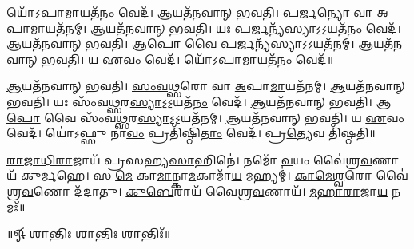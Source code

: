 𑌯𑍋᳴𑌽𑌪𑌾\-\ul{𑌮𑌾}\-𑌯𑌤᳴\-\ul{𑌨𑌂} 𑌵𑍇𑌦᳴। \ul{𑌆}\-𑌯𑌤᳴𑌨𑌵𑌾𑌨𑍍‌ 𑌭𑌵𑌤𑌿।
\-\ul{𑌪}\-𑌰𑍍𑌜\-\ul{𑌨𑍍𑌯𑍋} 𑌵𑌾 \ul{𑌅}\-𑌪𑌾\-\ul{𑌮𑌾}\-𑌯𑌤᳴𑌨𑌮𑍍। \ul{𑌆}\-𑌯𑌤᳴𑌨𑌵𑌾𑌨𑍍‌ 𑌭𑌵𑌤𑌿। 
𑌯𑌃 \ul{𑌪}\-𑌰𑍍𑌜𑌨𑍍𑌯᳴\-\ul{𑌸𑍍𑌯𑌾}\-𑌽॒𑌽॒𑌯𑌤᳴\-\ul{𑌨𑌂} 𑌵𑍇𑌦᳴। \ul{𑌆}\-𑌯𑌤᳴𑌨𑌵𑌾𑌨𑍍‌ 𑌭𑌵𑌤𑌿। 
𑌆\-\ul{𑌪𑍋} 𑌵𑍈 \ul{𑌪}\-𑌰𑍍𑌜𑌨𑍍𑌯᳴\-\ul{𑌸𑍍𑌯𑌾}\-𑌽॒𑌽॒𑌯𑌤᳴𑌨𑌮𑍍। \ul{𑌆}\-𑌯𑌤᳴𑌨𑌵𑌾𑌨𑍍‌ 𑌭𑌵𑌤𑌿। 
𑌯 \ul{𑌏}\-𑌵𑌂 𑌵𑍇𑌦᳴। 𑌯𑍋᳴𑌽𑌪𑌾\-\ul{𑌮𑌾}\-𑌯𑌤᳴\-\ul{𑌨𑌂} 𑌵𑍇𑌦᳴॥



\-\ul{𑌆}\-𑌯𑌤᳴𑌨𑌵𑌾𑌨𑍍‌ 𑌭𑌵𑌤𑌿। \ul{𑌸𑌂}\-\-\ul{𑌵}\-\-\ul{𑌥𑍍𑌸}\-𑌰𑍋 𑌵𑌾 \ul{𑌅}\-𑌪𑌾\-\ul{𑌮𑌾}\-𑌯𑌤᳴𑌨𑌮𑍍। 
\-\ul{𑌆}\-𑌯𑌤᳴𑌨𑌵𑌾𑌨𑍍‌ 𑌭𑌵𑌤𑌿। 𑌯𑌃 𑌸𑌂᳴𑌵\-\ul{𑌥𑍍𑌸}\-𑌰\-\ul{𑌸𑍍𑌯𑌾}\-𑌽॒𑌽॒𑌯𑌤᳴\-\ul{𑌨𑌂} 𑌵𑍇𑌦᳴। 
\-\ul{𑌆}\-𑌯𑌤᳴𑌨𑌵𑌾𑌨𑍍‌ 𑌭𑌵𑌤𑌿। 𑌆\-\ul{𑌪𑍋} 𑌵𑍈 𑌸𑌂᳴𑌵\-\ul{𑌥𑍍𑌸}\-𑌰\-\ul{𑌸𑍍𑌯𑌾}\-𑌽॒𑌽॒𑌯𑌤᳴𑌨𑌮𑍍‌। 
\-\ul{𑌆}\-𑌯𑌤᳴𑌨𑌵𑌾𑌨𑍍‌ 𑌭𑌵𑌤𑌿। 𑌯 \ul{𑌏}\-𑌵𑌂 𑌵𑍇𑌦᳴। 
𑌯𑍋॑𑌽𑌫𑍍𑌸𑍁 𑌨𑌾\-\ul{𑌵𑌂} 𑌪𑍍𑌰𑌤𑌿᳴𑌷𑍍𑌠𑌿\-\ul{𑌤𑌾𑌂} 𑌵𑍇𑌦᳴। 𑌪𑍍𑌰\-\ul{𑌤𑍍𑌯𑍇}\-𑌵 𑌤𑌿᳴𑌷𑍍𑌠𑌤𑌿॥

\-\ul{𑌰𑌾}\-\-\ul{𑌜𑌾}\-\-\ul{𑌧𑌿}\-\-\ul{𑌰𑌾}\-𑌜𑌾𑌯᳴ 𑌪𑍍𑌰𑌸𑌹𑍍𑌯\-\ul{𑌸𑌾}\-𑌹𑌿𑌨𑍇॑। 
𑌨𑌮𑍋᳴ \ul{𑌵}\-𑌯𑌂 𑌵𑍈॑𑌶𑍍𑌰\-\ul{𑌵}\-𑌣𑌾𑌯᳴ 𑌕𑍁𑌰𑍍𑌮𑌹𑍇। 𑌸 \ul{𑌮𑍇} 𑌕𑌾\-\ul{𑌮𑌾}\-𑌨𑍍𑌕𑌾\-\ul{𑌮}\-𑌕𑌾𑌮𑌾᳴\-\ul{𑌯} 𑌮𑌹𑍍𑌯𑌮𑍍‌॑। 
\-\ul{𑌕𑌾}\-\-\ul{𑌮𑍇}\-\-\ul{𑌶𑍍𑌵}\-𑌰𑍋 𑌵𑍈॑𑌶𑍍𑌰\-\ul{𑌵}\-𑌣𑍋 𑌦᳴𑌦𑌾𑌤𑍁। \ul{𑌕𑍁}\-\-\ul{𑌬𑍇}\-𑌰𑌾𑌯᳴ 𑌵𑍈𑌶𑍍𑌰\-\ul{𑌵}\-𑌣𑌾𑌯᳴। 
\-\ul{𑌮}\-\-\ul{𑌹𑌾}\-\-\ul{𑌰𑌾}\-𑌜𑌾\-\ul{𑌯} 𑌨𑌮𑌃᳴॥
\centerline{॥𑍐 𑌶𑌾\-\ul{𑌨𑍍𑌤𑌿𑌃} 𑌶𑌾\-\ul{𑌨𑍍𑌤𑌿𑌃} 𑌶𑌾𑌨𑍍𑌤𑌿𑌃᳴॥}
